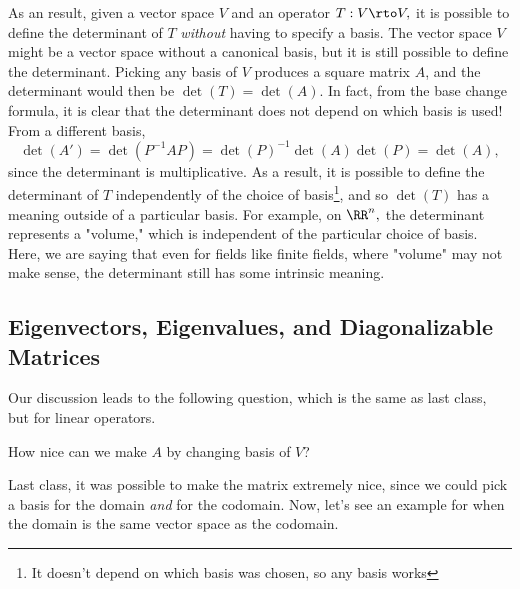 As an result, given a vector space $V$ and an operator $T: V \rto V,$ it is possible to define the determinant of $T$ \emph{without} having to specify a basis. The vector space $V$ might be a vector space without a canonical basis, but it is still possible to define the determinant. Picking any basis of $V$ produces a square matrix $A$, and the determinant would then be $\det(T) = \det(A).$ In fact, from the base change formula, it is clear that the determinant does not depend on which basis is used! From a different basis, \[\det(A') = \det(P^{-1}AP) = \det(P)^{-1}\det(A)\det(P) = \det(A),\] since the determinant is multiplicative. As a result, it is possible to define the determinant of $T$ independently of the choice of basis\footnote{It doesn't depend on which basis was chosen, so any basis works}, and so $\det(T)$ has a meaning outside of a particular basis. For example, on $\RR^n,$ the determinant represents a "volume," which is independent of the particular choice of basis. Here, we are saying that even for fields like finite fields, where "volume" may not make sense, the determinant still has some intrinsic meaning.

\subsection{Eigenvectors, Eigenvalues, and Diagonalizable Matrices}
Our discussion leads to the following question, which is the same as last class, but for linear operators.
\begin{qq}
How nice can we make $A$ by changing basis of $V$?
\end{qq}

Last class, it was possible to make the matrix extremely nice, since we could pick a basis for the domain \emph{and} for the codomain. Now, let's see an example for when the domain is the same vector space as the codomain. 

